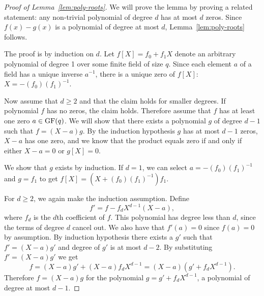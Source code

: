 \begin{proof}[Proof of Lemma~\ref{lem:poly-roots}]
  We will prove the lemma by proving a related statement: any non-trivial polynomial of degree $d$ has at most $d$ zeros. Since $f(x) - g(x)$ is a polynomial of degree at most $d$, Lemma~\ref{lem:poly-roots} follows.
  
  The proof is by induction on $d$. Let $f[X] = f_0 + f_1 X$ denote an arbitrary polynomial of degree 1 over some finite field of size $q$. Since each element $a$ of a field has a unique inverse $a^{-1}$, there is a unique zero of $f[X]$: $X = -(f_0)(f_1)^{-1}$.
  
  Now assume that $d \geq 2$ and that the claim holds for smaller degrees. If polynomial $f$ has no zeros, the claim holds. Therefore assume that $f$ has at least one zero $a \in \operatorname{GF}(q)$. We will show that there exists a polynomial $g$ of degree $d-1$ such that $f = (X-a)g$. By the induction hypothesis $g$ has at most $d-1$ zeros, $X-a$ has one zero, and we know that the product equals zero if and only if either $X-a = 0$ or $g[X] = 0$.
  
  We show that $g$ exists by induction. If $d=1$, we can select $a = -(f_0)(f_1)^{-1}$ and $g = f_1$ to get $f[X] = (X + (f_0)(f_1)^{-1})f_1$.
  
  For $d \geq 2$, we again make the induction assumption. Define
  \[
  f' = f - f_d X^{d-1} (X-a),
  \]
  where $f_d$ is the $d$th coefficient of $f$. This polynomial has degree less than $d$, since the terms of degree $d$ cancel out. We also have that $f'(a) = 0$ since $f(a) = 0$ by assumption. By induction hypothesis there exists a $g'$ such that $f' = (X-a)g'$ and degree of $g'$ is at most $d-2$. By substituting $f' = (X-a)g'$ we get
  \[
    f = (X-a)g' + (X-a)f_d X^{d-1} = (X-a)(g' + f_d X^{d-1}).
  \]
  Therefore $f = (X-a)g$ for the polynomial $g = g' + f_d X^{d-1}$, a polynomial of degree at most $d-1$.
\end{proof}
